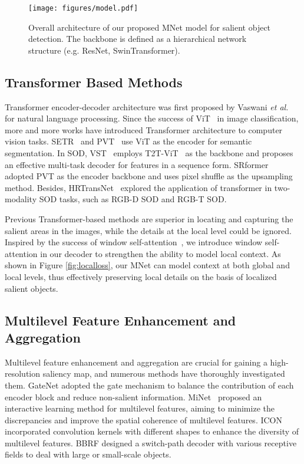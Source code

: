 \documentclass[lettersize,journal]{IEEEtran}
\begin{document}
\begin{figure*}[t]
	\centering \texttt{[image: figures/model.pdf]}
	\caption{Overall architecture of our proposed MNet model for salient object detection. 
		The backbone is defined as a hierarchical network structure (e.g. ResNet\cite{ResNet}, SwinTransformer\cite{Swin}). 
}
	\label{fig:model}
\end{figure*}
\subsection{Transformer Based Methods}
Transformer encoder-decoder architecture was first proposed by Vaswani \textit{et al.}~\cite{Attentionisallyouneed} for natural language processing. Since the success of ViT~\cite{Vit} in image classification, more and more works have introduced Transformer architecture to computer vision tasks. SETR~\cite{SETR} and PVT~\cite{wang2021pyramid} use ViT as the encoder for semantic segmentation. 
In SOD, VST~\cite{VST} employs T2T-ViT~\cite{Yuan_2021_ICCV} as the backbone and proposes an effective multi-task decoder for features in a sequence form. 
SRformer~\cite{SelfReformer} adopted PVT as the encoder backbone and uses pixel shuffle as the upsampling method. 
Besides, HRTransNet~\cite{Tang2023RTransNet} explored the application of transformer in two-modality SOD tasks, such as RGB-D SOD and RGB-T SOD. 

Previous Transformer-based methods are superior in locating and capturing the salient areas in the images, while the details at the local level could be ignored. Inspired by the success of window self-attention~\cite{Swin}, we introduce window self-attention in our decoder to strengthen the ability to model local context. As shown in Figure \ref{fig:localloss}, our MNet can model context at both global and local levels, thus effectively preserving local details on the basis of localized salient objects. 
\subsection{Multilevel Feature Enhancement and Aggregation}
Multilevel feature enhancement and aggregation are crucial for gaining a high-resolution saliency map, and numerous methods have thoroughly investigated them. 
GateNet\cite{GateNet} adopted the gate mechanism to balance the contribution of each encoder block and reduce non-salient information. 
MiNet~\cite{MiNet} proposed an interactive learning method for multilevel features, aiming to minimize the discrepancies and improve the spatial coherence of multilevel features. 
ICON\cite{ICON} incorporated convolution kernels with different shapes to enhance the diversity of multilevel features. 
BBRF\cite{BBRF} designed a switch-path decoder with various receptive fields to deal with large or small-scale objects. 
\end{document}
